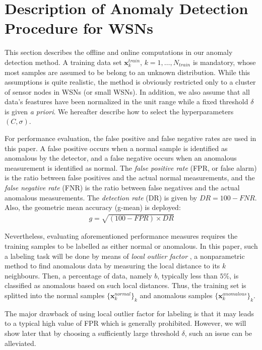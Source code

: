 \documentclass[conference]{IEEEtran}
\theoremstyle{problemstyle}
\begin{document}
\section{Description of Anomaly Detection Procedure for WSNs}\label{sec:implementation}

This section describes the offline and online computations in our anomaly detection method. A training data set $\mathbf{x}_k^{train}$, $k=1,\dots,N_{train}$ is mandatory, whose most samples are assumed to be belong to an unknown distribution. While this assumptions is quite realistic, the method is obviously restricted only to a cluster of sensor nodes in WSNs (or small WSNs). In addition, we also assume that all data's feastures have been normalized in the unit range while a fixed threshold $\delta$ is given \emph{a priori}. We hereafter describe how to select the hyperparameters $(C, \sigma)$.

For performance evaluation, the false positive and false negative rates are used in this paper. A false positive occurs when a normal sample is identified as anomalous by the detector, and a false negative occurs when an anomalous measurement is identified as normal. The \emph{false positive rate} (FPR, or false alarm) is the ratio between false positives and the actual normal measurements, and the \emph{false negative rate} (FNR) is the ratio between false negatives and the actual anomalous measurements. The \emph{detection rate} (DR) is given by $DR=100-FNR$. Also, the geometric mean accuracy (g-mean) is deployed:
\begin{align}\label{eq:gmean}
g = \sqrt{(100-FPR) \times DR}
\end{align}

Nevertheless, evaluating aforementioned performance measures requires the training samples to be labelled as either normal or anomalous. In this paper, such a labeling task will be done by means of \emph{local outlier factor} \cite{breunig2000lof}, a nonparametric method to find anomalous data by measuring the local distance to its $k$ neighbours. Then, a percentage of data, namely $b$, typically less than $5 \%$, is classified as anomalous based on such local distances. Thus, the training set is splitted into the normal samples $\{\mathbf{x}_k^{normal}\}_k$ and anomalous samples $\{\mathbf{x}_k^{anomalous}\}_k$.

The major drawback of using local outlier factor for labeling is that it may leads to a typical high value of FPR which is generally prohibited. However, we will show later that by choosing a sufficiently large threshold $\delta$, such an issue can be alleviated.
\end{document}
